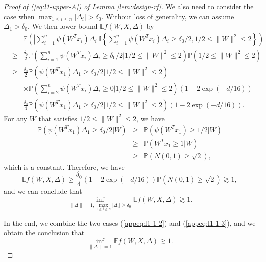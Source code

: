 \begin{proof}[Proof of (\ref{eq:l1-upper-A}) of Lemma \ref{lem:design-rf}]
We also need to consider the case when $\max_{1\leq i\leq n}|\Delta_i|> \delta_0$. Without loss of generality, we can assume $\Delta_1>\delta_0$.
We then lower bound $\mathbb{E}f(W,X,\Delta)$ by
\begin{eqnarray*}
&& \mathbb{E}\left(\left|\sum_{i=1}^n\psi(W^Tx_i)\Delta_i\right|\mathbb{I}\left\{\sum_{i=1}^n\psi(W^Tx_i)\Delta_i \geq \delta_0/2, 1/2\leq \|W\|^2\leq 2\right\}\right) \\
&\geq& \frac{\delta_0}{2} \mathbb{P}\left(\sum_{i=1}^n\psi(W^Tx_i)\Delta_i \geq \delta_0/2\Big| 1/2\leq \|W\|^2\leq 2\right)\mathbb{P}\left(1/2\leq \|W\|^2\leq 2\right) \\
&\geq& \frac{\delta_0}{2} \mathbb{P}\left(\psi(W^Tx_1)\Delta_1 \geq \delta_0/2\Big|1/2\leq \|W\|^2\leq 2\right) \\
&& \times \mathbb{P}\left(\sum_{i=2}^n\psi(W^Tx_i)\Delta_i \geq 0\Big|1/2\leq \|W\|^2\leq 2\right)\left(1-2\exp(-d/16)\right) \\
&=& \frac{\delta_0}{4} \mathbb{P}\left(\psi(W^Tx_1)\Delta_1 \geq \delta_0/2\Big|1/2\leq \|W\|^2\leq 2\right)\left(1-2\exp(-d/16)\right).
\end{eqnarray*}
For any $W$ that satisfies $1/2\leq \|W\|^2\leq 2$, we have
\begin{eqnarray*}
\mathbb{P}\left(\psi(W^Tx_1)\Delta_1 \geq \delta_0/2\Big|W\right) &\geq& \mathbb{P}\left(\psi(W^Tx_1)\geq 1/2\Big|W\right) \\
&\geq&  \mathbb{P}\left(W^Tx_1\geq 1\Big|W\right) \\
&\geq& \mathbb{P}\left(N(0,1)\geq \sqrt{2}\right),
\end{eqnarray*}
which is a constant.
Therefore, we have
$$\mathbb{E}f(W,X,\Delta)\geq \frac{\delta_0}{4}\left(1-2\exp(-d/16)\right)\mathbb{P}\left(N(0,1)\geq \sqrt{2}\right)\gtrsim 1,$$
and we can conclude that
\begin{equation}
\inf_{\|\Delta\|=1, \max_{1\leq i\leq n}|\Delta_i|\geq\delta_0}\mathbb{E}f(W,X,\Delta) \gtrsim 1.\label{appeq:l1-1-3}
\end{equation}

In the end, we combine the two cases (\ref{appeq:l1-1-2}) and (\ref{appeq:l1-1-3}),  and we obtain the conclusion that
$$\inf_{\|\Delta\|=1}\mathbb{E}f(W,X,\Delta)\gtrsim 1.$$



\end{proof}

